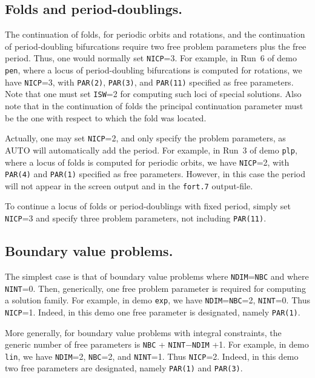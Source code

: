 \documentclass[12pt]{report}
\begin{document}
\subsection{ Folds and period-doublings.}
The continuation of folds, for periodic orbits and rotations,
and the continuation of period-doubling bifurcations require two free 
problem parameters plus the free period. Thus, one would normally set {\tt NICP}=3.
For example, in Run~6 of demo {\tt pen}, where a locus of period-doubling
bifurcations is computed for rotations, we have {\tt NICP}=3, 
with {\tt PAR(2)}, {\tt PAR(3)}, and {\tt PAR(11)} specified as free parameters. 
Note that one must set {\tt ISW}=2 for computing such loci of special solutions.
Also note that in the continuation of folds the principal continuation parameter
must be the one with respect to which the fold was located.

Actually, one may set {\tt NICP}=2, and only specify the problem parameters,
as {\cal AUTO} will automatically add the period.
For example, in Run~3 of demo {\tt plp}, where a locus of folds is computed 
for periodic orbits, we have {\tt NICP}=2, with {\tt PAR(4)} and {\tt PAR(1)} specified
as free parameters. 
However, in this case the period will not appear in the screen output 
and in the {\tt fort.7} output-file. 

To continue a locus of folds or period-doublings with fixed period, simply
set {\tt NICP}=3 and specify three problem parameters, not including {\tt PAR(11)}.

\subsection{ Boundary value problems.}
The simplest case is that of boundary value problems where 
{\tt NDIM}={\tt NBC} 
and where {\tt NINT}=0.
Then, generically, one free problem parameter is required for computing 
a solution family.
For example, in demo {\tt exp}, we have {\tt NDIM}={\tt NBC}=2, {\tt NINT}=0. 
Thus {\tt NICP}=1.
Indeed, in this demo one free parameter is designated,
namely {\tt PAR(1)}.

More generally, for boundary value problems with integral constraints,
the generic number of free parameters is {\tt NBC} + {\tt NINT}$-${\tt NDIM} +1.
For example, in demo {\tt lin}, we have {\tt NDIM}=2, {\tt NBC}=2, and {\tt NINT}=1.
Thus {\tt NICP}=2. 
Indeed, in this demo two free parameters are designated,
namely {\tt PAR(1)} and {\tt PAR(3)}.
\end{document}
